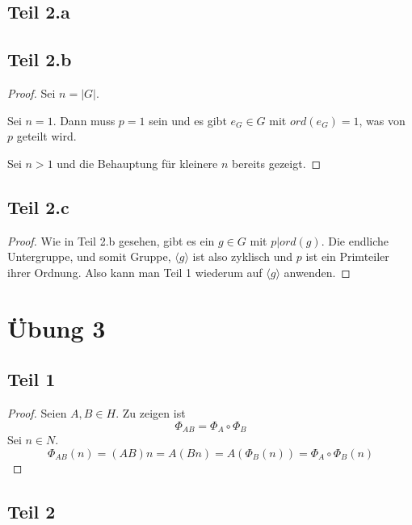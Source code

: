 \documentclass[10pt,a4paper]{article}
\begin{document}
\subsection{Teil 2.a}

\subsection{Teil 2.b}

\begin{proof}
  Sei $n = |G|$.

  Sei $n = 1$.
  Dann muss $p = 1$ sein und es gibt $e_{G} \in G$ mit $ord(e_{G}) = 1$, was von $p$ geteilt wird.

  Sei $n > 1$ und die Behauptung für kleinere $n$ bereits gezeigt.
\end{proof}

\subsection{Teil 2.c}

\begin{proof}
  Wie in Teil 2.b gesehen, gibt es ein $g \in G$ mit $p | ord(g)$.
  Die endliche Untergruppe, und somit Gruppe, $\langle g \rangle$ ist also zyklisch und $p$ ist ein Primteiler ihrer Ordnung.
  Also kann man Teil 1 wiederum auf $\langle g \rangle$ anwenden.
\end{proof}

\section{Übung 3}

\subsection{Teil 1}

\begin{proof}
  Seien $A, B \in H$.
  Zu zeigen ist
  \begin{equation}
    \Phi_{AB} = \Phi_{A} \circ \Phi_{B}
  \end{equation}
  Sei $n \in N$.
  \begin{equation}
    \Phi_{AB}(n) = (AB)n = A(Bn) = A(\Phi_{B}(n)) = \Phi_{A} \circ \Phi_{B}(n)
  \end{equation}
\end{proof}

\subsection{Teil 2}
\end{document}
